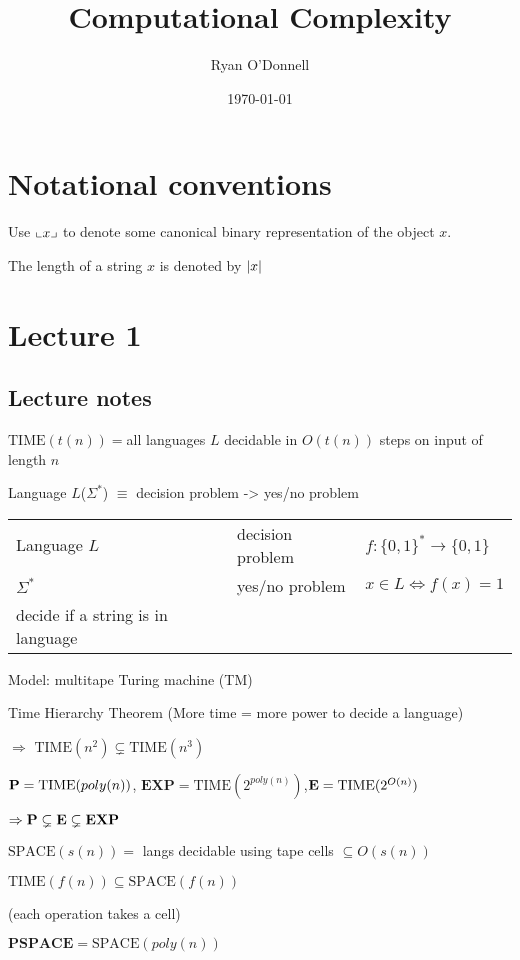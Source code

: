 \documentclass[11pt]{article}
\author{Ryan O'Donnell}
\date{\today}
\title{Computational Complexity}
\def \TIME {\text{TIME}}
\def \EXP {\textbf{EXP}}
\def \SPACE {\text{SPACE}}
\def \PSPACE {\textbf{PSPACE}}
\begin{document}
\maketitle
\tableofcontents

\section{Notational conventions}
\label{sec:org776b252}
Use \(\llcorner x \lrcorner\) to denote some canonical binary representation of the object \(x\).

The length of a string \(x\) is denoted by \(\abs{x}\)
\section{Lecture 1}
\label{sec:org7b6faeb}
\subsection{Lecture notes}
\label{sec:orgefce18b}
\(\TIME(t(n))=\)all languages \(L\) decidable in \(O(t(n))\) steps on input of length \(n\)

Language \(L\)(\(\Sigma^*\)) \(\equiv\) decision problem -> yes/no problem

\begin{center}
\begin{tabular}{lll}
Language \(L\) & decision problem & \(f:\{0,1\}^*\to\{0,1\}\)\\
\(\Sigma^*\) & yes/no problem & \(x\in L\Leftrightarrow f(x)=1\)\\
decide if a string is in language &  & \\
\end{tabular}
\end{center}

Model: multitape Turing machine (TM)

Time Hierarchy Theorem (More time = more power to decide a language)

\(\Rightarrow\) \(\TIME(n^2)\subsetneq\TIME(n^3)\)

\(\bP=\TIME(poly(n))\), \(\EXP=\TIME(2^{poly(n)})\),\(\bE=\TIME(2^{O(n)})\)

\(\Rightarrow\bP\subsetneq\bE\subsetneq\EXP\)

\(\SPACE(s(n))=\) langs decidable using tape cells \(\subseteq O(s(n))\)

\(\TIME(f(n))\subseteq\SPACE(f(n))\)

(each operation takes a cell)

\(\PSPACE=\SPACE(poly(n))\)
\end{document}
